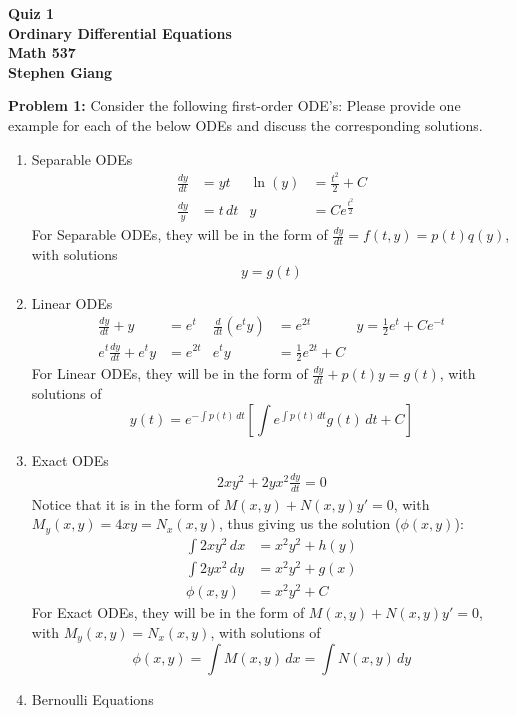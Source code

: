 \documentclass[11pt]{article}
\newcommand{\skipline}{\vspace{\baselineskip}}
\newenvironment{problem}[1]{\textbf{Problem #1: }}{\newpage}
\begin{document}
	
	\begin{center}
		\textbf{Quiz 1} \\
		\textbf{Ordinary Differential Equations} \\
		\textbf{Math 537} \\
		\textbf{Stephen Giang} \\
	\end{center}
	\skipline
	\begin{problem}{1}
		Consider the following first-order ODE's: 
		Please provide one example for each of the below ODEs and discuss the
		corresponding solutions.
		\begin{enumerate}[label = (\alph*)]
			\item Separable ODEs
			\begin{align*}
				\frac{dy}{dt} &= yt & \ln(y) &= \frac{t^2}{2} + C\\
				\frac{dy}{y} &= t\,dt & y &= Ce^{\frac{t^2}{2}}
			\end{align*}
			For Separable ODEs, they will be in the form of $\frac{dy}{dt} = f(t,y) = p(t)q(y)$, with solutions 
			$$ y = g(t) $$
			\item Linear ODEs
			\begin{align*}
				\frac{dy}{dt} + y &= e^t & \frac{d}{dt}(e^{t} y) &= e^{2t} & y = \frac{1}{2}e^t + Ce^{-t}\\
				e^t \frac{dy}{dt} + e^t y &= e^{2t} & e^{t} y &= \frac{1}{2}e^{2t} + C
			\end{align*}
			For Linear ODEs, they will be in the form of $\frac{dy}{dt} + p(t)y = g(t)$, with solutions of 
			$$y(t) = e^{-\int p(t)\,dt} \left[\int e^{\int p(t)\,dt}g(t)\,dt + C\right]$$
			\item Exact ODEs
			\begin{align*}
				2xy^2 + 2yx^2\frac{dy}{dt} = 0 
			\end{align*}
			Notice that it is in the form of $M(x,y) + N(x,y)y' = 0$, with $M_y(x,y) = 4xy = N_x(x,y)$, thus giving us the solution ($\phi(x,y)$):
			\begin{align*}
				\int 2xy^2 \, dx &= x^2y^2 + h(y) \\
				\int 2yx^2 \, dy &= x^2y^2 + g(x) \\
				\phi(x,y) &= x^2y^2 + C
			\end{align*}
			For Exact ODEs, they will be in the form of $M(x,y) + N(x,y)y' = 0$, with $M_y(x,y) = N_x(x,y)$, with solutions of
			$$\phi(x,y)=\int M(x,y)\,dx = \int N(x,y)\,dy$$ 
			\newpage
			\item Bernoulli Equations

\end{enumerate}
\end{problem}
\end{document}
